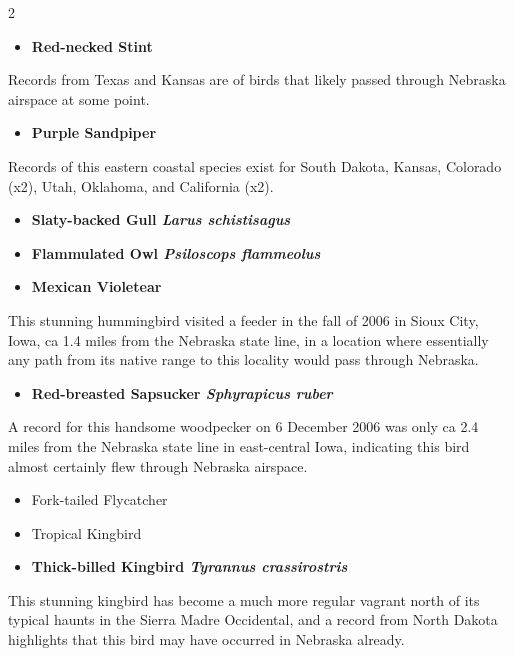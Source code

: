\documentclass[10pt,letterpaper]{article}
\begin{document}
\begin{multicols}{2}
	\begin{itemize}
		\item \textbf{Red-necked Stint}
	\end{itemize}
	Records from Texas and Kansas are of birds that likely passed through Nebraska airspace at some point.
	
	\begin{itemize}
		\item \textbf{Purple Sandpiper}
	\end{itemize}
	Records of this eastern coastal species exist for South Dakota, Kansas, Colorado (x2), Utah, Oklahoma, and California (x2).
	
	\begin{itemize}
		\item \textbf{Slaty-backed Gull \textit{Larus schistisagus}}
	\end{itemize}
	
	
	\begin{itemize}
		\item \textbf{Flammulated Owl \textit{Psiloscops flammeolus}}
	\end{itemize}
	
	
	\begin{itemize}
		\item \textbf{Mexican Violetear}
	\end{itemize}
	This stunning hummingbird visited a feeder in the fall of 2006 in Sioux City, Iowa, ca 1.4 miles from the Nebraska state line, in a location where essentially any path from its native range to this locality would pass through Nebraska.
	
	\begin{itemize}
		\item \textbf{Red-breasted Sapsucker \textit{Sphyrapicus ruber}}
	\end{itemize}
	A record for this handsome woodpecker on 6 December 2006 was only ca 2.4 miles from the Nebraska state line in east-central Iowa, indicating this bird almost certainly flew through Nebraska airspace.
	
	\begin{itemize}
		\item Fork-tailed Flycatcher
	\end{itemize}
	
	\begin{itemize}
		\item Tropical Kingbird
	\end{itemize}
	\begin{itemize}
		\item \textbf{Thick-billed Kingbird \textit{Tyrannus crassirostris}}
	\end{itemize}
	This stunning kingbird has become a much more regular vagrant north of its typical haunts in the Sierra Madre Occidental, and a record from North Dakota highlights that this bird may have occurred in Nebraska already.
	

\end{multicols}
\end{document}
